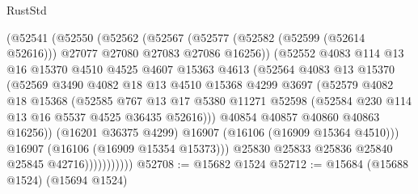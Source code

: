 \begin{lexlean}{RustStd}
\begin{coremodule}
                      (@52541
                        (@52550
                          (@52562
                            (@52567
                              (@52577
                                (@52582 (@52599 (@52614 @52616)))
                                @27077
                                @27080
                                @27083
                                @27086
                                @16256))
                            (@52552
                              @4083
                              @114
                              @13
                              @16
                              @15370
                              @4510
                              @4525
                              @4607
                              @15363
                              @4613
                              (@52564
                                @4083
                                @13
                                @15370
                                (@52569
                                  @3490
                                  @4082
                                  @18
                                  @13
                                  @4510
                                  @15368
                                  @4299
                                  @3697
                                  (@52579
                                    @4082
                                    @18
                                    @15368
                                    (@52585
                                      @767
                                      @13
                                      @17
                                      @5380
                                      @11271
                                      @52598
                                      (@52584 @230 @114 @13 @16 @5537 @4525 @36435 @52616)))
                                  @40854
                                  @40857
                                  @40860
                                  @40863
                                  @16256))
                              (@16201 @36375 @4299)
                              @16907
                              (@16106 (@16909 @15364 @4510)))
                            @16907
                            (@16106 (@16909 @15354 @15373)))
                          @25830
                          @25833
                          @25836
                          @25840
                          @25845
                          @42716)))))))))))
@52708 := @15682 @1524
@52712 := @15684 (@15688 @1524) (@15694 @1524)

\end{coremodule}
\end{lexlean}
